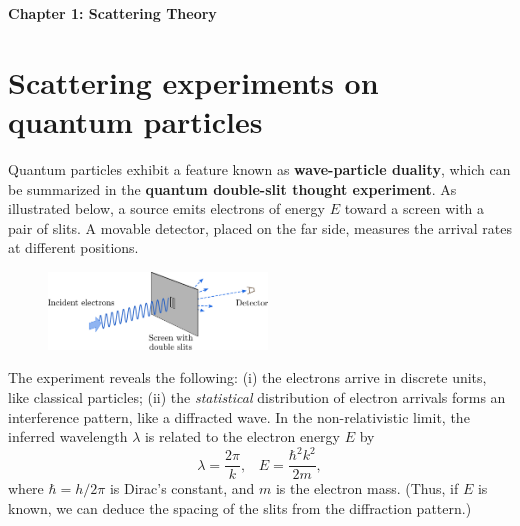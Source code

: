 \documentclass[prx,12pt]{revtex4-2}
\begin{document}
\begin{center}
{\Large \textbf{Chapter 1: Scattering Theory}}
\end{center}


\section{Scattering experiments on quantum particles}
\label{sec:scatintro}

Quantum particles exhibit a feature known as \textbf{wave-particle
  duality}, which can be summarized in the \textbf{quantum double-slit
  thought experiment}.  As illustrated below, a source emits electrons
of energy $E$ toward a screen with a pair of slits.  A movable
detector, placed on the far side, measures the arrival rates at
different positions.

\begin{figure}[h]
  \centering\includegraphics[width=0.52\textwidth]{doubleslit}
\end{figure}

The experiment reveals the following: (i) the electrons arrive in
discrete units, like classical particles; (ii) the
\textit{statistical} distribution of electron arrivals forms an
interference pattern, like a diffracted wave.  In the non-relativistic
limit, the inferred wavelength $\lambda$ is related to the electron
energy $E$ by
\begin{equation}
  \lambda = \frac{2\pi}{k}, \;\;\; E = \frac{\hbar^2k^2}{2m},
\end{equation}
where $\hbar = h/2\pi$ is Dirac's constant, and $m$ is the electron
mass.  (Thus, if $E$ is known, we can deduce the spacing of the slits
from the diffraction pattern.)

\end{document}
